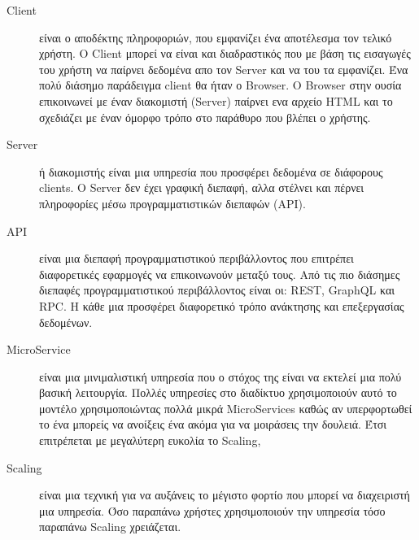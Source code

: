 \begin{Definitions}
\begin{description}
    \item [Client] είναι ο αποδέκτης πληροφοριών, που εμφανίζει ένα αποτέλεσμα τον τελικό χρήστη. Ο Client μπορεί να είναι και διαδραστικός που με βάση τις εισαγωγές του χρήστη να παίρνει δεδομένα απο τον Server και να του τα εμφανίζει. Ένα πολύ διάσημο παράδειγμα client θα ήταν ο Browser. Ο Browser στην ουσία επικοινωνεί με έναν διακομιστή (Server) παίρνει ενα αρχείο HTML και το σχεδιάζει με έναν όμορφο τρόπο στο παράθυρο που βλέπει ο χρήστης.
    \item [Server] ή διακομιστής είναι μια υπηρεσία που προσφέρει δεδομένα σε διάφορους clients. Ο Server δεν έχει γραφική διεπαφή, αλλα στέλνει και πέρνει πληροφορίες μέσω προγραμματιστικών διεπαφών (API). 
    \item [API] είναι μια διεπαφή προγραμματιστικού περιβάλλοντος που επιτρέπει διαφορετικές εφαρμογές να επικοινωνούν μεταξύ τους. Από τις πιο διάσημες διεπαφές προγραμματιστικού περιβάλλοντος είναι οι: REST, GraphQL και RPC. Η κάθε μια προσφέρει διαφορετικό τρόπο ανάκτησης και επεξεργασίας δεδομένων.
    \item [MicroService] είναι μια μινιμαλιστική υπηρεσία που ο στόχος της είναι να εκτελεί μια πολύ βασική λειτουργία. Πολλές υπηρεσίες στο διαδίκτυο χρησιμοποιούν αυτό το μοντέλο χρησιμοποιώντας πολλά μικρά MicroServices καθώς αν υπερφορτωθεί το ένα μπορείς να ανοίξεις ένα ακόμα για να μοιράσεις την δουλειά. Έτσι επιτρέπεται με μεγαλύτερη ευκολία το Scaling, 
    \item [Scaling] είναι μια τεχνική για να αυξάνεις το μέγιστο φορτίο που μπορεί να διαχειριστή μια υπηρεσία. Όσο παραπάνω χρήστες χρησιμοποιούν την υπηρεσία τόσο παραπάνω Scaling χρειάζεται.
\end{description}

\end{Definitions}